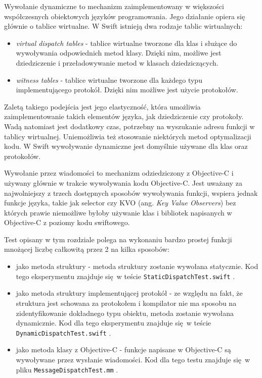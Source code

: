 \documentclass[mgr, shortabstract]{iithesis}
\newcommand{\ang}[1]{ang. \textit{#1}}
\newcommand{\swiftinline}[1]{
    \texttt{#1}
}
\begin{document}
Wywołanie dynamiczne to mechanizm zaimplementowany w większości współczesnych obiektowych języków programowania. Jego działanie opiera się głównie o tablice wirtualne. W Swift istnieją dwa rodzaje tablic wirtualnych:

\begin{itemize}
    \item \textit{virtual dispatch tables} - tablice wirtualne tworzone dla klas i służące do wywoływania odpowiednich metod klasy. Dzięki nim, możliwe jest dziedziczenie i przeładowywanie metod w klasach dziedziczących.
    \item \textit{witness tables} - tablice wirtualne tworzone dla każdego typu implementującego protokół. Dzięki nim możliwe jest użycie protokołów.
\end{itemize}

Zaletą takiego podejścia jest jego elastyczność, która umożliwia zaimplementowanie takich elementów języka, jak dziedziczenie czy protokoły. Wadą natomiast jest dodatkowy czas, potrzebny na wyszukanie adresu funkcji w tablicy wirtualnej. Uniemożliwia też stosowanie niektórych metod optymalizacji kodu. W Swift wywoływanie dynamiczne jest domyślnie używane dla klas oraz protokołów.

Wywołanie przez wiadomości to mechanizm odziedziczony z Objective-C i używany głównie w trakcie wywoływania kodu Objective-C. Jest uważany za najwolniejszy z trzech dostępnych sposobów wywoływania funkcji, wspiera jednak funkcje języka, takie jak selector czy KVO (\ang{Key Value Observers}) bez których prawie niemożliwe byłoby używanie klas i bibliotek napisanych w Objective-C z poziomy kodu swiftowego.

Test opisany w tym rozdziale polega na wykonaniu bardzo prostej funkcji mnożącej liczbę całkowitą przez 2 na kilka sposobów:

\begin{itemize}
    \item jako metoda struktury - metoda struktury zostanie wywołana statycznie. Kod tego eksperymentu znajduje się w teście \swiftinline{StaticDispatchTest.swift}.
    \item jako metoda struktury implementującej protokół - ze względu na fakt, że struktura jest schowana za protokołem i kompilator nie ma sposobu na zidentyfikowanie dokładnego typu obiektu, metoda zostanie wywołana dynamicznie. Kod dla tego eksperymentu znajduje się w teście \swiftinline{DynamicDispatchTest.swift}.
    \item jako metoda klasy z Objective-C - funkcje napisane w Objective-C są wywoływane przez wysłanie wiadomości. Kod dla tego testu znajduje się w pliku \swiftinline{MessageDispatchTest.mm}.
\end{itemize}
\end{document}
